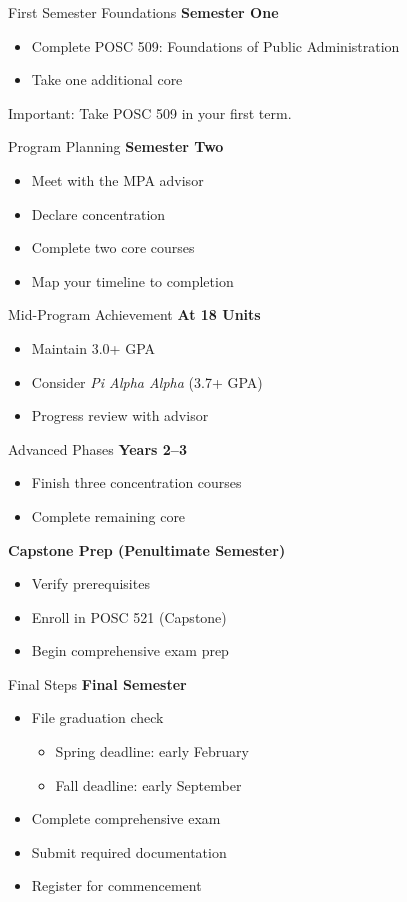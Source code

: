 \documentclass[10pt]{beamer}
\begin{document}
\begin{frame}{First Semester Foundations}
\textbf{Semester One}
\begin{itemize}
  \item Complete POSC 509: Foundations of Public Administration
  \item Take one additional core
\end{itemize}
\alert{Important:} Take POSC 509 in your first term.
\end{frame}

\begin{frame}{Program Planning}
\textbf{Semester Two}
\begin{itemize}
  \item Meet with the MPA advisor
  \item Declare concentration
  \item Complete two core courses
  \item Map your timeline to completion
\end{itemize}
\end{frame}

\begin{frame}{Mid-Program Achievement}
\textbf{At 18 Units}
\begin{itemize}
  \item Maintain 3.0+ GPA
  \item Consider \emph{Pi Alpha Alpha} (3.7+ GPA)
  \item Progress review with advisor
\end{itemize}
\end{frame}

\begin{frame}{Advanced Phases}
\textbf{Years 2–3}
\begin{itemize}
  \item Finish three concentration courses
  \item Complete remaining core
\end{itemize}
\textbf{Capstone Prep (Penultimate Semester)}
\begin{itemize}
  \item Verify prerequisites
  \item Enroll in POSC 521 (Capstone)
  \item Begin comprehensive exam prep
\end{itemize}
\end{frame}

\begin{frame}{Final Steps}
\textbf{Final Semester}
\begin{itemize}
  \item File graduation check
    \begin{itemize}
      \item Spring deadline: early February
      \item Fall deadline: early September
    \end{itemize}
  \item Complete comprehensive exam
  \item Submit required documentation
  \item Register for commencement
\end{itemize}
\end{frame}
\end{document}
